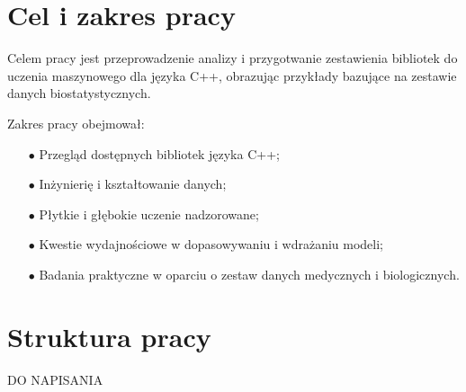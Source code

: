 \section{Cel i zakres pracy} %

Celem pracy jest przeprowadzenie analizy i przygotwanie zestawienia bibliotek do uczenia maszynowego dla języka C++, obrazując przykłady bazujące na zestawie danych biostatystycznych.

Zakres pracy obejmował:

\begin{itemize}
    \item [$\bullet$] Przegląd dostępnych bibliotek języka C++;
    \item [$\bullet$] Inżynierię i kształtowanie danych;
    \item [$\bullet$] Płytkie i głębokie uczenie nadzorowane;
    \item [$\bullet$] Kwestie wydajnościowe w dopasowywaniu i wdrażaniu modeli;
    \item [$\bullet$] Badania praktyczne w oparciu o zestaw danych medycznych i biologicznych.
\end{itemize}

\section{Struktura pracy} %
DO NAPISANIA
